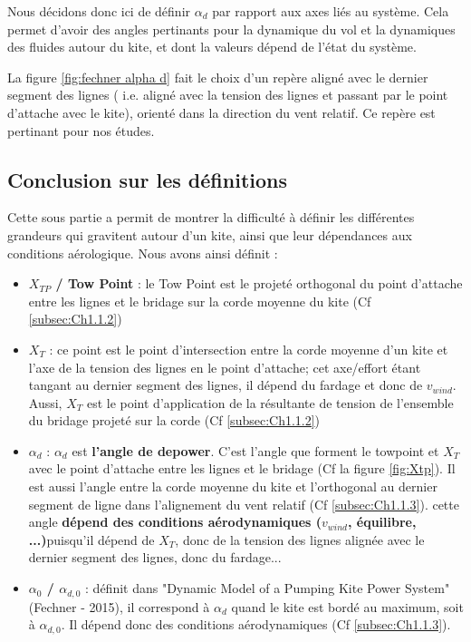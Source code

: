 Nous décidons donc ici de définir $\alpha_d$ par rapport aux axes liés au système. Cela permet d'avoir des angles pertinants pour la dynamique du vol et la dynamiques des fluides autour du kite, et dont la valeurs dépend de l'état du système. 

La figure \ref{fig:fechner alpha d} fait le choix d'un repère aligné avec le dernier segment des lignes ( i.e. aligné avec la tension des lignes et passant par le point d'attache avec le kite), orienté dans la direction du vent relatif. Ce repère est pertinant pour nos études. 

\subsection{Conclusion sur les définitions} 
\label{subsec:Ch1.1.4}

Cette sous partie a permit de montrer la difficulté à définir les différentes grandeurs qui gravitent autour d'un kite, ainsi que leur dépendances aux conditions aérologique. Nous avons ainsi définit :
\begin{itemize}
    \item \textbf{$X_{TP}$ / Tow Point} : le Tow Point est le projeté orthogonal du point d’attache entre les lignes et le bridage sur la corde moyenne du kite (Cf \ref{subsec:Ch1.1.2})
    \item \textbf{$X_T$} : ce point est le point d’intersection entre la corde moyenne d’un kite et l’axe de la tension des lignes en le point d'attache; cet axe/effort étant tangant au dernier segment des lignes, il dépend du fardage et donc de $v_{wind}$. Aussi, $X_T$ est le point d’application de la résultante de tension de l’ensemble du bridage projeté sur la corde (Cf \ref{subsec:Ch1.1.2})
    \item \textbf{$\alpha_d$} : $\alpha_d$ est \textbf{l'angle de depower}. C'est l'angle que forment le towpoint et $X_T$ avec le point d'attache entre les lignes et le bridage (Cf la figure \ref{fig:Xtp}). Il est aussi l'angle entre la corde moyenne du kite et l'orthogonal au dernier segment de ligne dans l'alignement du vent relatif (Cf \ref{subsec:Ch1.1.3}). cette angle \textbf{dépend des conditions aérodynamiques ($v_{wind}$, équilibre, ...)}puisqu'il dépend de $X_T$, donc de la tension des lignes alignée avec le dernier segment des lignes, donc du fardage...
    \item \textbf{$\alpha_0$ / $\alpha_{d,0}$} : définit dans "Dynamic Model of a Pumping Kite Power System" (Fechner - 2015), il correspond à $\alpha_d$ quand le kite est bordé au maximum, soit à $\alpha_{d,0}$. Il dépend donc des conditions aérodynamiques (Cf \ref{subsec:Ch1.1.3}).
\end{itemize}

